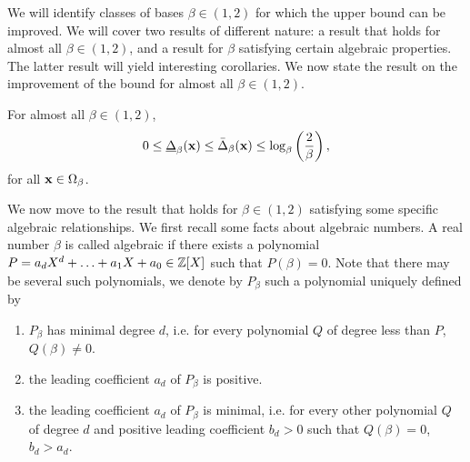 	We will identify classes of bases $\beta \in (1,2)$ for which the upper bound can be improved. We will cover two results of different nature: a result that holds for almost all $\beta \in (1,2)$, and a result for $\beta$ satisfying certain algebraic properties. The latter result will yield interesting corollaries. We now state the result on the improvement of the bound for almost all $\beta \in (1,2)$.
	\begin{theorem} \label{thm:upper bound on the relative compressibility of beta expansions for almost all beta in 1 sqrt 2}
		For almost all $\beta \in (1,2)$,
		\begin{equation}
			0 \leq \underline\Delta_\beta({\bf x}) \leq \bar\Delta_\beta({\bf x}) \leq \log_\beta\left(\frac{2}{\beta}\right),
		\end{equation}
		for all ${\bf x} \in \Omega_\beta$.
	\end{theorem}
	We now move to the result that holds for $\beta \in (1,2)$ satisfying some specific algebraic relationships. We first recall some facts about algebraic numbers. A real number $\beta$ is called algebraic if there exists a polynomial $P = a_d X^d + \ldots + a_1X + a_0 \in \mathbb{Z}[X]$ such that $P(\beta)=0$. Note that there may be several such polynomials, we denote by $P_\beta$ such a polynomial uniquely defined by
	\begin{enumerate}[label = (\alph*)]
		\item $P_\beta$ has minimal degree $d$, i.e. for every polynomial $Q$ of degree less than $P$, $Q(\beta) \neq 0$.
		\item the leading coefficient $a_d$ of $P_\beta$ is positive.
		\item  the leading coefficient $a_d$ of $P_\beta$ is minimal, i.e. for every other polynomial $Q$ of degree $d$ and positive leading coefficient $b_d > 0$ such that $Q(\beta) = 0$, $b_d > a_d$.
	\end{enumerate}
